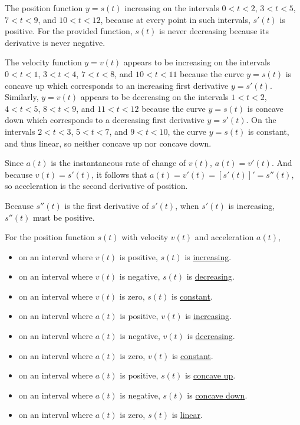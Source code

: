 \begin{activitySolution}
\ba
	\item The position function $y = s(t)$ increasing on the intervals $0<t<2$, $3<t<5$, $7<t<9$, and $10<t<12$, because at every point in such intervals, $s'(t)$ is positive.  For the provided function, $s(t)$ is never decreasing because its derivative is never negative.
	\item The velocity function $y = v(t)$ appears to be increasing on the intervals $0<t<1$, $3<t<4$, $7<t<8$, and $10<t<11$ because the curve $y = s(t)$ is concave up which corresponds to an increasing first derivative $y =s'(t)$.  Similarly, $y = v(t)$ appears to be decreasing on the intervals $1<t<2$, $4<t<5$, $8<t<9$, and $11<t<12$ because the curve $y = s(t)$ is concave down which corresponds to a decreasing first derivative $y =s'(t)$.  On the intervals $2<t<3$, $5<t<7$, and $9<t<10$, the curve $y = s(t)$ is constant, and thus linear, so neither concave up nor concave down.  
	\item Since $a(t)$ is the instantaneous rate of change of $v(t)$, $a(t) = v'(t)$.  And because $v(t) = s'(t)$, it follows that $a(t) = v'(t) = [s'(t)]' = s''(t)$, so acceleration is the second derivative of position. 
	\item Because $s''(t)$ is the first derivative of $s'(t)$, when $s'(t)$ is increasing, $s''(t)$ must be positive.
	\item For the position function $s(t)$ with velocity $v(t)$ and acceleration $a(t)$,
	\begin{itemize}
		\item on an interval where $v(t)$ is positive, $s(t)$ is \underline{increasing}.
		\item on an interval where $v(t)$ is negative, $s(t)$ is \underline{decreasing}. 
		\item on an interval where $v(t)$ is zero, $s(t)$ is \underline{constant}.

		\item on an interval where $a(t)$ is positive, $v(t)$ is \underline{increasing}.
		\item on an interval where $a(t)$ is negative, $v(t)$ is \underline{decreasing}. 
		\item on an interval where $a(t)$ is zero, $v(t)$ is \underline{constant}.

		\item on an interval where $a(t)$ is positive, $s(t)$ is \underline{concave up}.
		\item on an interval where $a(t)$ is negative, $s(t)$ is \underline{concave down}. 
		\item on an interval where $a(t)$ is zero, $s(t)$ is \underline{linear}.
	\end{itemize}
\ea
\end{activitySolution}
\aftera